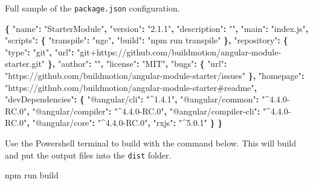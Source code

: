\documentclass[]{book}
\newenvironment{Shaded}{\begin{snugshade}}{\end{snugshade}}
\newcommand{\StringTok}[1]{\textcolor[rgb]{0.31,0.60,0.02}{#1}}
\newcommand{\OperatorTok}[1]{\textcolor[rgb]{0.81,0.36,0.00}{\textbf{#1}}}
\newcommand{\NormalTok}[1]{#1}
\theoremstyle{definition}
\theoremstyle{definition}
\theoremstyle{definition}
\theoremstyle{remark}
\begin{document}
Full sample of the \texttt{package.json} configuration.

\begin{Shaded}
\begin{Highlighting}[]
\OperatorTok{\{}
  \StringTok{"name"}\OperatorTok{:} \StringTok{"StarterModule"}\OperatorTok{,}
  \StringTok{"version"}\OperatorTok{:} \StringTok{"2.1.1"}\OperatorTok{,}
  \StringTok{"description"}\OperatorTok{:} \StringTok{""}\OperatorTok{,}
  \StringTok{"main"}\OperatorTok{:} \StringTok{"index.js"}\OperatorTok{,}
  \StringTok{"scripts"}\OperatorTok{:} \OperatorTok{\{}
    \StringTok{"transpile"}\OperatorTok{:} \StringTok{"ngc"}\OperatorTok{,}
    \StringTok{"build"}\OperatorTok{:} \StringTok{"npm run transpile"}
  \OperatorTok{\},}
  \StringTok{"repository"}\OperatorTok{:} \OperatorTok{\{}
    \StringTok{"type"}\OperatorTok{:} \StringTok{"git"}\OperatorTok{,}
    \StringTok{"url"}\OperatorTok{:} \StringTok{"git+https://github.com/buildmotion/angular-module-starter.git"}
  \OperatorTok{\},}
  \StringTok{"author"}\OperatorTok{:} \StringTok{""}\OperatorTok{,}
  \StringTok{"license"}\OperatorTok{:} \StringTok{"MIT"}\OperatorTok{,}
  \StringTok{"bugs"}\OperatorTok{:} \OperatorTok{\{}
    \StringTok{"url"}\OperatorTok{:} \StringTok{"https://github.com/buildmotion/angular-module-starter/issues"}
  \OperatorTok{\},}
  \StringTok{"homepage"}\OperatorTok{:} \StringTok{"https://github.com/buildmotion/angular-module-starter#readme"}\OperatorTok{,}
  \StringTok{"devDependencies"}\OperatorTok{:} \OperatorTok{\{}
    \StringTok{"@angular/cli"}\OperatorTok{:} \StringTok{"^1.4.1"}\OperatorTok{,}
    \StringTok{"@angular/common"}\OperatorTok{:} \StringTok{"^4.4.0-RC.0"}\OperatorTok{,}
    \StringTok{"@angular/compiler"}\OperatorTok{:} \StringTok{"^4.4.0-RC.0"}\OperatorTok{,}
    \StringTok{"@angular/compiler-cli"}\OperatorTok{:} \StringTok{"^4.4.0-RC.0"}\OperatorTok{,}
    \StringTok{"@angular/core"}\OperatorTok{:} \StringTok{"^4.4.0-RC.0"}\OperatorTok{,}
    \StringTok{"rxjs"}\OperatorTok{:} \StringTok{"^5.0.1"}
  \OperatorTok{\}}
\OperatorTok{\}}
\end{Highlighting}
\end{Shaded}

Use the Powershell terminal to build with the command below. This will
build and put the output files into the \texttt{dist} folder.

\begin{Shaded}
\begin{Highlighting}[]
\NormalTok{npm run build}
\end{Highlighting}
\end{Shaded}
\end{document}

